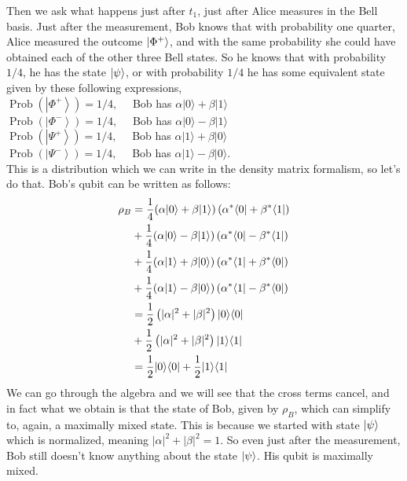 Then we ask what happens just after $t_1$, just after Alice measures in the Bell basis. Just after the measurement, Bob knows that with probability one quarter, Alice measured the outcome $\left| \Phi^+ \right\rangle$, and with the same probability she could have obtained each of the other three  Bell states. So he knows that with probability $1/4$, he has the state $\left| \psi \right\rangle$, or with probability $1/4$ he has some equivalent state given by these following expressions,\\
$\operatorname{Prob}\left(\left|\Phi^{+}\right\rangle\right)=1 / 4, \quad$ Bob has $\alpha|0\rangle+\beta|1\rangle$\\
$\operatorname{Prob}\left(\left|\Phi^{-}\right\rangle\right)=1 / 4, \quad$ Bob has $\alpha|0\rangle-\beta|1\rangle$\\
$\operatorname{Prob}\left(\left|\Psi^{+}\right\rangle\right)=1 / 4, \quad$ Bob has $\alpha|1\rangle+\beta|0\rangle$\\
$\operatorname{Prob}\left(\left|\Psi^{-}\right\rangle\right)=1 / 4, \quad$ Bob has $\alpha|1\rangle-\beta|0\rangle$.\\

This is a distribution which we can write in the density matrix formalism, so let's do that. Bob's qubit can be written as follows:
\begin{equation}
\begin{aligned}
\rho_B &=\frac{1}{4}(\alpha|0\rangle+\beta|1\rangle)\left(\alpha^*\langle 0|+\beta^*\langle 1|\right) \\
&+\frac{1}{4}(\alpha|0\rangle-\beta|1\rangle)\left(\alpha^*\langle 0|-\beta^*\langle 1|\right) \\
&+\frac{1}{4}(\alpha|1\rangle+\beta|0\rangle)\left(\alpha^*\langle 1|+\beta^*\langle 0|\right) \\
&+\frac{1}{4}(\alpha|1\rangle-\beta|0\rangle)\left(\alpha^*\langle 1|-\beta^*\langle 0|\right) \\
&=\frac{1}{2}\left(|\alpha|^2+|\beta|^2\right)|0 \rangle \langle 0| \\
&+\frac{1}{2}\left(|\alpha|^2+|\beta|^2\right)|1 \rangle \langle 1| \\
&=\frac{1}{2}|0 \rangle \langle 0|+\frac{1}{2}|1 \rangle \langle 1|
\end{aligned}
\end{equation}
We can go through the algebra and we will see that the cross terms cancel, and in fact what we obtain is that the state of Bob, given by $\rho_B$, which can simplify to, again, a maximally mixed state. This is because we started with state $\left| \psi \right\rangle$ which is normalized, meaning $|\alpha|^2+|\beta|^2 = 1$. So even just after the measurement, Bob still doesn't know anything about the state $\left| \psi \right\rangle$. His qubit is maximally mixed.

